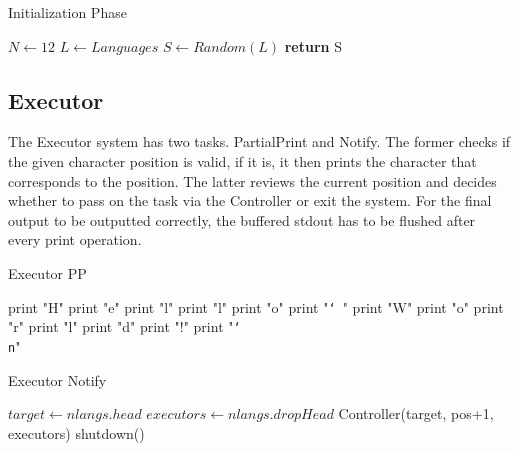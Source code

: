 \documentclass[11pt]{article}
\begin{document}
\begin{algorithm}[H]
\caption{Initialization Phase}
\label{Special Edition}
\begin{algorithmic}[1]
\State $N\gets 12$
\State $L\gets Languages$
	\State $S\gets Random(L)$
\EndFor
\State \textbf{return} S
\EndProcedure
\end{algorithmic}
\end{algorithm}

\subsection{Executor}
The Executor system has two tasks. PartialPrint and Notify. The former checks if the given character position is valid, if it is, it then prints the character that corresponds to the position. The latter reviews the current position and decides whether to pass on the task via the Controller or exit the system.
\newline{}\newline{}
For the final output to be outputted correctly, the buffered stdout has to be flushed after every print operation.
\vfill
\begin{algorithm}[H]
\caption{Executor PP}
\label{Special Edition}
\begin{algorithmic}[t]
	\State print "H"
	\State print "e"
	\State print "l" 
	\State print "l"
	\State print "o"
	\State print "\texttt{\char`\ }"
	\State print "W"
	\State print "o"
	\State print "r"
	\State print "l" 
	\State print "d"
	\State print "!"
	\State print "\texttt{\char`\\n}"
\EndIf
\EndProcedure
\end{algorithmic}
\end{algorithm}

\begin{algorithm}[H]
\caption{Executor Notify}
\label{Special Edition}
\begin{algorithmic}[t]
 \State $target\gets nlangs.head$
	\State $executors\gets nlangs.dropHead$	
	\State Controller(target,  pos+1, executors)
\Else
	\State shutdown() 
\EndIf
\EndProcedure
\end{algorithmic}
\end{algorithm}
\raggedbottom
\end{document}
